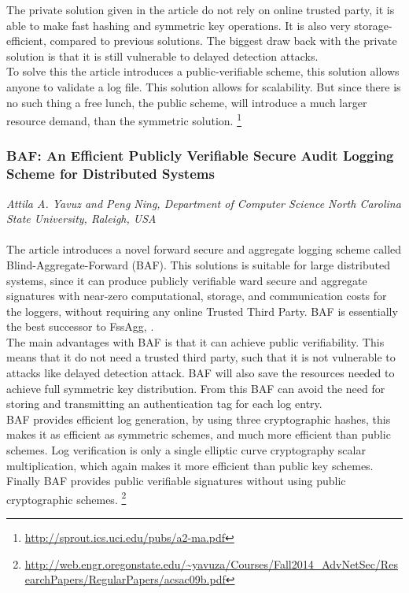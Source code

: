The private solution given in the article do not rely on online trusted party, it is able to make fast hashing and symmetric key operations. It is also very storage-efficient, compared to previous solutions. The biggest draw back with the private solution is that it is still vulnerable to delayed detection attacks.\\
To solve this the article introduces a public-verifiable scheme, this solution allows anyone to validate a log file. This solution allows for scalability. But since there is no such thing a free lunch, the public scheme, will introduce a much larger resource demand, than the symmetric solution. \footnote{\url{http://sprout.ics.uci.edu/pubs/a2-ma.pdf}}


\subsubsection{BAF: An Efficient Publicly Verifiable Secure Audit Logging Scheme for Distributed Systems}
\footnotesize\textit{Attila A. Yavuz and Peng Ning, Department of Computer Science North Carolina State University, Raleigh, USA}\\\\
\normalsize
The article introduces a novel forward secure and aggregate logging scheme called Blind-Aggregate-Forward (BAF). This solutions is suitable for large distributed systems, since it can produce publicly verifiable ward secure and aggregate signatures with near-zero computational, storage, and communication costs for the loggers, without requiring any online Trusted Third Party.  BAF is essentially the best successor to FssAgg, . \\
The main advantages with BAF is that it can achieve public verifiability. This means that it do not need a trusted third party, such that it is not vulnerable to attacks like delayed detection attack. BAF will also save the resources needed to achieve full symmetric key distribution. From this BAF can avoid the need for storing and transmitting an authentication tag for each log entry.  \\
BAF provides efficient log generation, by using three cryptographic hashes, this makes it as efficient as symmetric schemes, and much more efficient than public schemes. Log verification is only a single elliptic curve cryptography scalar multiplication, which again makes it more efficient than public key schemes. Finally BAF provides public verifiable signatures without using public cryptographic schemes. \footnote{\raggedright \url{http://web.engr.oregonstate.edu/~yavuza/Courses/Fall2014_AdvNetSec/ResearchPapers/RegularPapers/acsac09b.pdf}}

